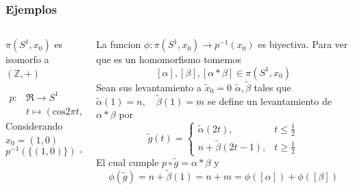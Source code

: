 \documentclass[xetex,mathserif,serif]{beamer}
\begin{document}
  \begin{frame}
    \frametitle{Ejemplos}
    \begin{columns}
      \begin{column}{0.4\textwidth}
        \(\pi (S^1,x_0)\) es isomorfo a \((\mathbb Z, +)\) \\
        \begin{center}
        \end{center}
        \begin{align*}
          p : &\Re \to S^1 \\
              &t \mapsto \left( \text{cos} 2\pi t , \text{sin} 2 \pi t \right)
        \end{align*}
        Considerando \(x_0 = (1,0)\)
        \[ p^{-1} (\{(1,0)\}) = \mathbb Z \]
      \end{column}

      \begin{column}{0.6\textwidth}
        La funcion \(\phi : \pi (S^1 , x_0) \to p^{-1} (x_0)\) es
        biyectiva. Para ver que es un homomorfismo tomemos
        \[ [\alpha], [\beta] ,[\alpha * \beta] \in \pi (S^1 , x_0)\]
        Sean sus levantamiento a \(\tilde x_0 = 0\) \(\tilde \alpha,
        \tilde \beta\) tales que
        \( \tilde \alpha (1) = n , \quad \tilde \beta (1) = m \)
        se define un levantamiento de \(\alpha * \beta\) por
        \[ \tilde g (t) =
          \begin{cases}
            \tilde \alpha (2t), & t \leq \frac 1 2 \\
            n + \tilde \beta (2t - 1), & t \geq \frac 1 2
          \end{cases}
        \]
        El cual cumple \(p \circ \tilde g = \alpha * \beta\) y
        \[ \phi (\tilde g) = n + \tilde \beta (1) = n + m =
          \phi([\alpha]) + \phi ([\beta]) \]
      \end{column}
    \end{columns}
  \end{frame}
\end{document}
